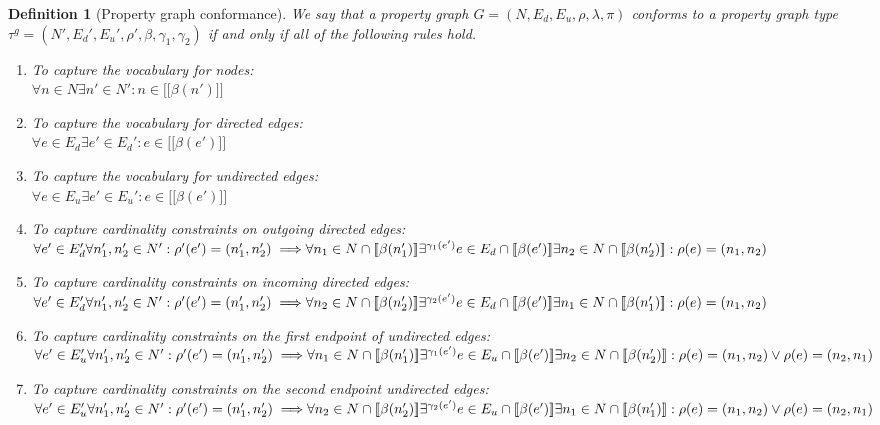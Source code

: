 \documentclass[a4paper]{article}
\newtheorem{definition}[theorem]{Definition}
\newcommand{\gtype}{\tau^g}
\newcommand{\lsem}{\ensuremath{[\![}}
\newcommand{\rsem}{\ensuremath{]\!]}}
\newcommand{\sem}[1]{\ensuremath{\lsem #1 \rsem}}
\begin{document}

\begin{definition}[Property graph conformance]
  We say that a property graph $G = (N, E_d, E_u, \rho, \lambda, \pi)$ \emph{conforms} to a property graph type $\gtype = (N', E_d', E_u', \rho', \beta, \gamma_1, \gamma_2)$ if and only if all of the following rules hold.

  \begin{enumerate}
    \item To capture the vocabulary for nodes:\\
    $\forall n \in N \exists n' \in N' : n \in \sem{\beta(n')}$
    
    \item To capture the vocabulary for directed edges:\\
    $\forall e \in E_d \exists e' \in E_d' : e \in \sem{\beta(e')}$

    \item To capture the vocabulary for undirected edges:\\
    $\forall e \in E_u \exists e' \in E_u' : e \in \sem{\beta(e')}$
    
    \item To capture cardinality constraints on outgoing directed edges:\\
    $\forall e' \in E_d' \forall n'_1, n'_2 \in N' : \rho'(e') = (n'_1, n'_2) \implies
    \\\forall n_1 \in N \cap \sem{\beta(n'_1)} \exists^{\gamma_1(e')} e \in E_d \cap \sem{\beta(e')} \exists n_2 \in N \cap \sem{\beta(n'_2)} : \rho(e) = (n_1, n_2)$

    \item To capture cardinality constraints on incoming directed edges:\\
    $\forall e' \in E_d' \forall n'_1, n'_2 \in N' : \rho'(e') = (n'_1, n'_2) \implies
    \\\forall n_2 \in N \cap \sem{\beta(n'_2)} \exists^{\gamma_2(e')} e \in E_d \cap \sem{\beta(e')} \exists n_1 \in N \cap \sem{\beta(n'_1)} : \rho(e) = (n_1, n_2)$
    
    \item To capture cardinality constraints on the first endpoint of undirected edges:\\
    $\forall e' \in E_u' \forall n'_1, n'_2 \in N' : \rho'(e') = (n'_1, n'_2) \implies
    \\\forall n_1 \in N \cap \sem{\beta(n'_1)} \exists^{\gamma_1(e')} e \in E_u \cap \sem{\beta(e')} \exists n_2 \in N \cap \sem{\beta(n'_2)} : \rho(e) = (n_1, n_2) \vee \rho(e) = (n_2, n_1)$

    \item To capture cardinality constraints on the second endpoint undirected edges:\\
    $\forall e' \in E_u' \forall n'_1, n'_2 \in N' : \rho'(e') = (n'_1, n'_2) \implies
    \\\forall n_2 \in N \cap \sem{\beta(n'_2)} \exists^{\gamma_2(e')} e \in E_u \cap \sem{\beta(e')} \exists n_1 \in N \cap \sem{\beta(n'_1)} : \rho(e) = (n_1, n_2) \vee \rho(e) = (n_2, n_1)$
  \end{enumerate}
\end{definition}

\end{document}
